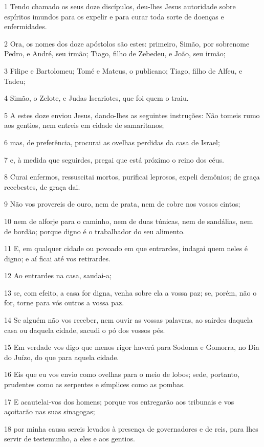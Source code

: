 \par 1 Tendo chamado os seus doze discípulos, deu-lhes Jesus autoridade sobre espíritos imundos para os expelir e para curar toda sorte de doenças e enfermidades.
\par 2 Ora, os nomes dos doze apóstolos são estes: primeiro, Simão, por sobrenome Pedro, e André, seu irmão; Tiago, filho de Zebedeu, e João, seu irmão;
\par 3 Filipe e Bartolomeu; Tomé e Mateus, o publicano; Tiago, filho de Alfeu, e Tadeu;
\par 4 Simão, o Zelote, e Judas Iscariotes, que foi quem o traiu.
\par 5 A estes doze enviou Jesus, dando-lhes as seguintes instruções: Não tomeis rumo aos gentios, nem entreis em cidade de samaritanos;
\par 6 mas, de preferência, procurai as ovelhas perdidas da casa de Israel;
\par 7 e, à medida que seguirdes, pregai que está próximo o reino dos céus.
\par 8 Curai enfermos, ressuscitai mortos, purificai leprosos, expeli demônios; de graça recebestes, de graça dai.
\par 9 Não vos provereis de ouro, nem de prata, nem de cobre nos vossos cintos;
\par 10 nem de alforje para o caminho, nem de duas túnicas, nem de sandálias, nem de bordão; porque digno é o trabalhador do seu alimento.
\par 11 E, em qualquer cidade ou povoado em que entrardes, indagai quem neles é digno; e aí ficai até vos retirardes.
\par 12 Ao entrardes na casa, saudai-a;
\par 13 se, com efeito, a casa for digna, venha sobre ela a vossa paz; se, porém, não o for, torne para vós outros a vossa paz.
\par 14 Se alguém não vos receber, nem ouvir as vossas palavras, ao sairdes daquela casa ou daquela cidade, sacudi o pó dos vossos pés.
\par 15 Em verdade vos digo que menos rigor haverá para Sodoma e Gomorra, no Dia do Juízo, do que para aquela cidade.
\par 16 Eis que eu vos envio como ovelhas para o meio de lobos; sede, portanto, prudentes como as serpentes e símplices como as pombas.
\par 17 E acautelai-vos dos homens; porque vos entregarão aos tribunais e vos açoitarão nas suas sinagogas;
\par 18 por minha causa sereis levados à presença de governadores e de reis, para lhes servir de testemunho, a eles e aos gentios.
